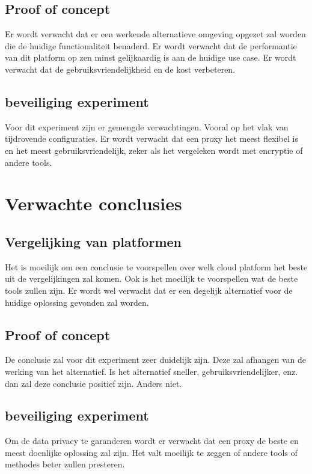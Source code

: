 \subsection{Proof of concept}
Er wordt verwacht dat er een werkende alternatieve omgeving opgezet zal worden die de huidige functionaliteit benaderd. Er wordt verwacht dat de performantie van dit platform op zen minst gelijkaardig is aan de huidige use case. Er wordt verwacht dat de gebruiksvriendelijkheid en de kost verbeteren.

\subsection{beveiliging experiment}

Voor dit experiment zijn er gemengde verwachtingen. Vooral op het vlak van tijdrovende configuraties. Er wordt verwacht dat een proxy het meest flexibel is en het meest gebruiksvriendelijk, zeker als het vergeleken wordt met encryptie of andere tools.

\section{Verwachte conclusies}
\label{sec:verwachte_conclusies}
\subsection{Vergelijking van platformen}
Het is moeilijk om een conclusie te voorspellen over welk cloud platform het beste uit de vergelijkingen zal komen. Ook is het moeilijk te voorspellen wat de beste tools zullen zijn. Er wordt wel verwacht dat er een degelijk alternatief voor de huidige oplossing gevonden zal worden. 

\subsection{Proof of concept}
De conclusie zal voor dit experiment zeer duidelijk zijn. Deze zal afhangen van de werking van het alternatief. Is het alternatief sneller, gebruiksvriendelijker, enz. dan zal deze conclusie positief zijn. Anders niet.

\subsection{beveiliging experiment}
Om de data privacy te garanderen wordt er verwacht dat een proxy de beste en meest doenlijke oplossing zal zijn. Het valt moeilijk te zeggen of andere tools of methodes beter zullen presteren.
